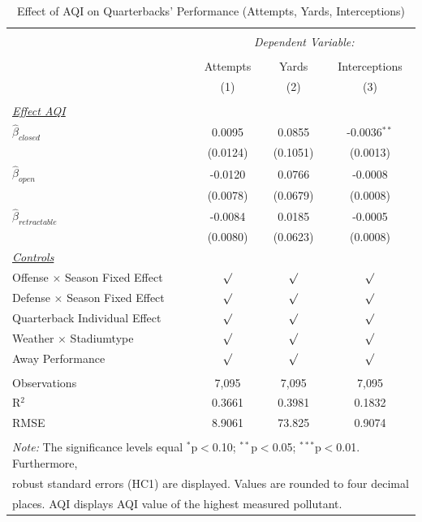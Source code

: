 \documentclass[12pt,a4paper]{article}
\begin{document}
{\begin{table}[!htbp] \centering 
 \caption{Effect of AQI on Quarterbacks' Performance (Attempts, Yards, Interceptions)} 
 \label{A:T3} 
\begin{tabular}{@{\extracolsep{5pt}}lccc} 
\hline \\[-1.8ex] 
& \multicolumn{3}{c}{\textit{Dependent Variable:}} \\ \cline{2-4} \\ [-1.8ex]
& Attempts & Yards & Interceptions \\ 
& (1) & (2) & (3)\\ \hline \\[-1.8ex] 
\underline{\textit{Effect AQI}}\\[0.4cm]
$\hat{\beta}_{closed}$& 0.0095 & 0.0855 & -0.0036$^{**}$ \\ 
& (0.0124) & (0.1051)& (0.0013) \\[0.4cm]
$\hat{\beta}_{open}$& -0.0120 & 0.0766 & -0.0008\\ 
& (0.0078) & (0.0679) & (0.0008) \\[0.4cm]
$\hat{\beta}_{retractable}$& -0.0084 & 0.0185 & -0.0005 \\ 
& (0.0080) & (0.0623) & (0.0008)\\ [0.4cm]
\underline{\textit{Controls}} \\[0.4cm]
Offense $\times$ Season Fixed Effect & $\surd$ & $\surd$ & $\surd$ \\[0.4cm]
Defense $\times$ Season Fixed Effect & $\surd$ & $\surd$ & $\surd$ \\[0.4cm]
Quarterback Individual Effect & $\surd$ & $\surd$ & $\surd$ \\[0.4cm]
Weather $\times $ Stadiumtype & $\surd$ & $\surd$ & $\surd$ \\[0.4cm]
Away Performance & $\surd$ & $\surd$ & $\surd$\\
\hline \\[-1.8ex] 
Observations & 7,095 & 7,095 & 7,095 \\ 
R$^{2}$ & 0.3661 & 0.3981 & 0.1832 \\ 
RMSE & 8.9061 & 73.825 & 0.9074 \\ \hline 
\hline \\[-1.8ex] 
\multicolumn{4}{l}{\footnotesize \textit{Note:} The significance levels equal {$^{*}$p$<$0.10; $^{**}$p$<$0.05; $^{***}$p$<$0.01}. Furthermore,} \\ \multicolumn{4}{l}{\footnotesize robust standard errors (HC1) are displayed. Values are rounded to four decimal} \\ \multicolumn{4}{l}{\footnotesize places. AQI displays AQI value of the highest measured pollutant.}

\end{tabular}
\end{table}}
\end{document}
